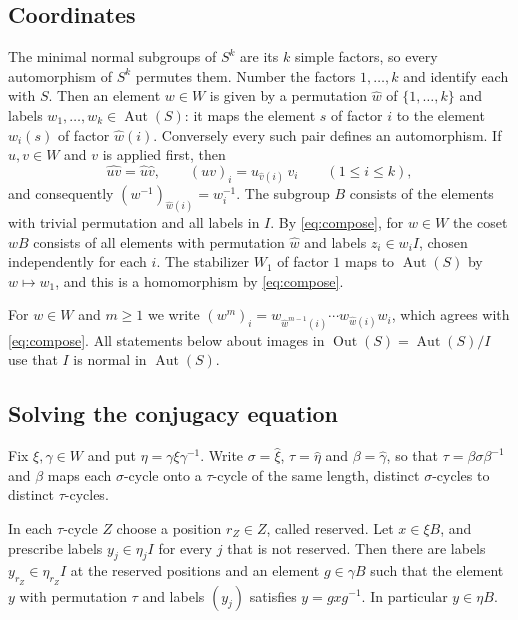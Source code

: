 \documentclass[11pt,colorlinks]{charlie}
\DeclareMathOperator{\Aut}{Aut}
\DeclareMathOperator{\Out}{Out}
\begin{document}
\subsection{Coordinates}
The minimal normal subgroups of $S^k$ are its $k$ simple factors, so every automorphism of $S^k$ permutes them. Number the factors $1,\dots,k$ and identify each with $S$. Then an element $w\in W$ is given by a permutation $\hat w$ of $\{1,\dots,k\}$ and labels $w_1,\dots,w_k\in\Aut(S)$: it maps the element $s$ of factor $i$ to the element $w_i(s)$ of factor $\hat w(i)$. Conversely every such pair defines an automorphism. If $u,v\in W$ and $v$ is applied first, then
\begin{equation}\label{eq:compose}
 \widehat{uv}=\hat u\hat v,\qquad (uv)_i=u_{\hat v(i)}\,v_i\qquad(1\le i\le k),
\end{equation}
and consequently $(w^{-1})_{\hat w(i)}=w_i^{-1}$. The subgroup $B$ consists of the elements with trivial permutation and all labels in $I$. By \eqref{eq:compose}, for $w\in W$ the coset $wB$ consists of all elements with permutation $\hat w$ and labels $z_i\in w_iI$, chosen independently for each $i$. The stabilizer $W_1$ of factor $1$ maps to $\Aut(S)$ by $w\mapsto w_1$, and this is a homomorphism by \eqref{eq:compose}.

For $w\in W$ and $m\ge1$ we write $(w^m)_i=w_{\hat w^{m-1}(i)}\cdots w_{\hat w(i)}w_i$, which agrees with \eqref{eq:compose}. All statements below about images in $\Out(S)=\Aut(S)/I$ use that $I$ is normal in $\Aut(S)$.

\subsection{Solving the conjugacy equation}

Fix $\xi,\gamma\in W$ and put $\eta=\gamma\xi\gamma^{-1}$. Write $\sigma=\hat\xi$, $\tau=\hat\eta$ and $\beta=\hat\gamma$, so that $\tau=\beta\sigma\beta^{-1}$ and $\beta$ maps each $\sigma$-cycle onto a $\tau$-cycle of the same length, distinct $\sigma$-cycles to distinct $\tau$-cycles.

\begin{lemma}\label{lem:closure}
In each $\tau$-cycle $Z$ choose a position $r_Z\in Z$, called reserved. Let $x\in\xi B$, and prescribe labels $y_j\in\eta_jI$ for every $j$ that is not reserved. Then there are labels $y_{r_Z}\in\eta_{r_Z}I$ at the reserved positions and an element $g\in\gamma B$ such that the element $y$ with permutation $\tau$ and labels $(y_j)$ satisfies $y=gxg^{-1}$. In particular $y\in\eta B$.
\end{lemma}
\end{document}
